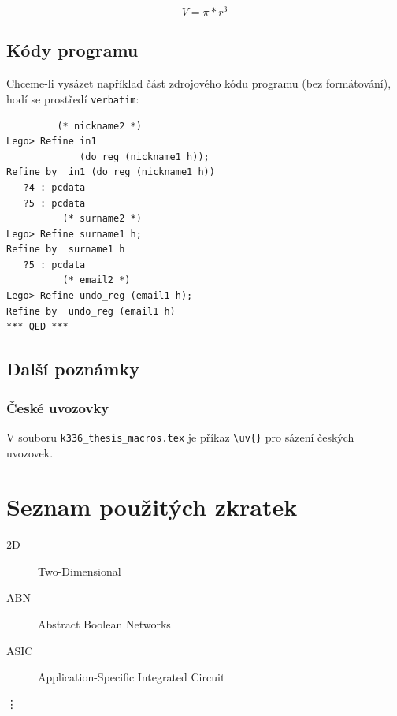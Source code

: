 \documentclass[11pt,oneside,a4paper]{book}
\begin{document}
\begin{equation}
  V = \pi * r^3
\end{equation}

\section{Kódy programu}
Chceme-li vysázet například část zdrojového kódu programu (bez formátování), hodí se prostředí \verb|verbatim|: 
\begin{verbatim}
         (* nickname2 *)
Lego> Refine in1
             (do_reg (nickname1 h));
Refine by  in1 (do_reg (nickname1 h))
   ?4 : pcdata
   ?5 : pcdata
          (* surname2 *)
Lego> Refine surname1 h;
Refine by  surname1 h
   ?5 : pcdata
          (* email2 *)
Lego> Refine undo_reg (email1 h);
Refine by  undo_reg (email1 h)
*** QED ***
\end{verbatim}

\section{Další poznámky}
\subsection{České uvozovky}
V souboru \verb|k336_thesis_macros.tex| je příkaz \verb|\uv{}| pro sázení českých uvozovek. 


\chapter{Seznam použitých zkratek}

\begin{description}
\item[2D] Two-Dimensional
\item[ABN] Abstract Boolean Networks
\item[ASIC] Application-Specific Integrated Circuit
\end{description}
\vdots
\end{document}
